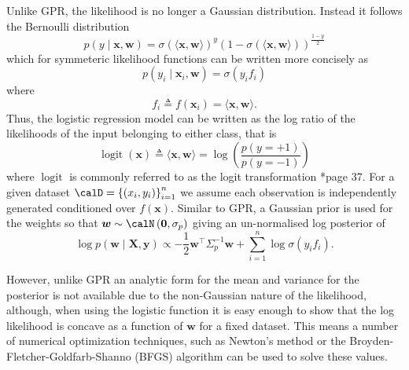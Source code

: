 Unlike GPR, the likelihood is no longer a Gaussian distribution. Instead it follows the Bernoulli distribution
\begin{equation*}
    p \left( y \mid \bm{x} , \bm{w} \right) = \sigma \left( \langle \bm{x} , \bm{w} \rangle \right)^{y} \left( 1 - \sigma \left( \langle \bm{x} , \bm{w} \rangle \right) \right)^{\frac{1 - y}{2}}
\end{equation*}
which for symmeteric likelihood functions can be written more concisely as
\begin{equation*}
    p \left( y_i \mid \bm{x}_i , \bm{w} \right) = \sigma \left( y_i f_i \right)
\end{equation*}
where
\begin{equation} \label{eq: GPC-lin-latent-func}
    f_i \triangleq f \left( \bm{x}_i \right) = \langle \bm{x} , \bm{w} \rangle .
\end{equation}
Thus, the logistic regression model can be written as the log ratio of the likelihoods of the input belonging to either class, that is
\begin{equation*}
    \operatorname{logit} \left( \bm{x} \right) \triangleq \langle \bm{x} , \bm{w} \rangle = \log \left( \frac{p \left( y = +1 \right)}{p \left( y = -1 \right)} \right)
\end{equation*}
where $\operatorname{logit}$ is commonly referred to as the logit transformation \cite{RasmussenCarlEdward2006Gpfm}*{page 37}. For a given dataset $\calD = \left\{ \left( x_i , y_i \right) \right\}_{i=1}^{n}$ we assume each observation is independently generated conditioned over $f \left( \bm{x} \right)$. Similar to GPR, a Gaussian prior is used for the weights so that $\bm{w} \sim \calN \left( \bm{0} , \sigma_p \right)$ giving an un-normalised log posterior of
\begin{equation*}
    \log p \left( \bm{w} \mid \bm{X} , \bm{y} \right) \propto - \frac{1}{2} \bm{w}^{\intercal} \Sigma_p^{-1} \bm{w} + \sum_{i=1}^{n} \log \sigma \left( y_i f_i \right).
\end{equation*}

However, unlike GPR an analytic form for the mean and variance for the posterior is not available due to the non-Gaussian nature of the likelihood, although, when using the logistic function it is easy enough to show that the log likelihood is concave as a function of $\bm{w}$ for a fixed dataset. This means a number of numerical optimization techniques, such as Newton's method or the Broyden-Fletcher-Goldfarb-Shanno (BFGS) algorithm \cite{FletcherR2000PMoO} can be used to solve these values.

